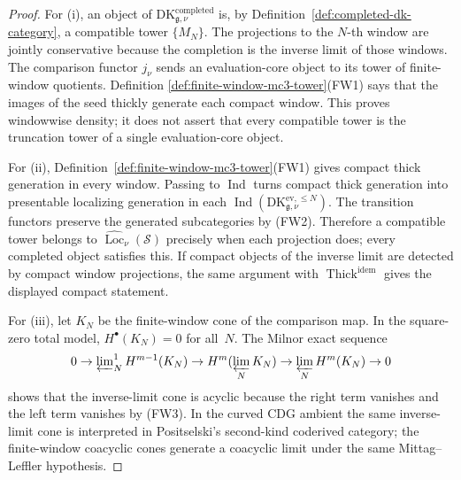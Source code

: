 \begin{proof}
For (i), an object of
$\mathrm{DK}^{\mathrm{completed}}_{\mathfrak g,\nu}$ is, by
Definition~\ref{def:completed-dk-category}, a compatible tower
$\{M_N\}$.  The projections to the $N$-th window are jointly
conservative because the completion is the inverse limit of those
windows.  The comparison functor $j_\nu$ sends an evaluation-core
object to its tower of finite-window quotients.  Definition
\ref{def:finite-window-mc3-tower}\textup{(FW1)} says that the images of
the seed thickly generate each compact window.  This proves
windowwise density; it does not assert that every compatible tower is
the truncation tower of a single evaluation-core object.

For (ii), Definition~\ref{def:finite-window-mc3-tower}(FW1) gives
compact thick generation in every window.  Passing to
$\operatorname{Ind}$ turns compact thick generation into presentable
localizing generation in each
$\operatorname{Ind}(\mathrm{DK}^{\mathrm{ev},\le N}_{\mathfrak g,\nu})$.
The transition functors preserve the generated subcategories by
(FW2).  Therefore a compatible tower belongs to
$\widehat{\operatorname{Loc}}_\nu(\mathcal S)$ precisely when each
projection does; every completed object satisfies this.  If compact
objects of the inverse limit are detected by compact window
projections, the same argument with
$\operatorname{Thick}^{\mathrm{idem}}$ gives the displayed compact
statement.

For (iii), let $K_N$ be the finite-window cone of the comparison map.
In the square-zero total model, $H^\bullet(K_N)=0$ for all~$N$.
The Milnor exact sequence
\[
0\to
\varprojlim\nolimits_N^1 H^{m-1}(K_N)
\to
H^m(\varprojlim_N K_N)
\to
\varprojlim_N H^m(K_N)
\to 0
\]
shows that the inverse-limit cone is acyclic because the right term
vanishes and the left term vanishes by (FW3).  In the curved CDG
ambient the same inverse-limit cone is interpreted in Positselski's
second-kind coderived category; the finite-window coacyclic cones
generate a coacyclic limit under the same Mittag--Leffler hypothesis.
\end{proof}

